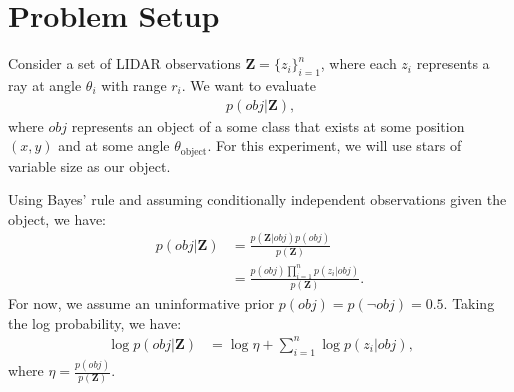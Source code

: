\section{Problem Setup}

Consider a set of LIDAR observations $\mathbf{Z} = \{ z_i \}_{i=1}^n$, where
each $z_i$ represents a ray at angle $\theta_i$ with range $r_i$. We
want to evaluate
%
\begin{align}
  p( obj | \mathbf{Z} )
  \text{,}
\end{align}
%
where $obj$ represents an object of a some class that exists at some position $(x,
y)$ and at some angle $\theta_{\text{object}}$. For this experiment, we will use
stars of variable size as our object.

Using Bayes' rule and assuming conditionally independent observations given the
object, we have:
%
\begin{align}
  p( obj | \mathbf{Z} ) &= \frac{p(\mathbf{Z} | obj) p(obj)}{p(\mathbf{Z})} \\
    &= \frac{p(obj) \prod_{i=1}^{n} { p( z_i | obj) }} {p(\mathbf{Z})}
  \text{.}
\end{align}
%
For now, we assume an uninformative prior $p(obj) = p(\lnot obj) = 0.5$. Taking
the log probability, we have:
%
\begin{align}
  \log p( obj | \mathbf{Z} ) &= \log{\eta} + \sum_{i=1}^{n} { \log p( z_i | obj) }
  \text{,}
  \label{eq:obj_model}
\end{align}
%
where $\eta = \frac{p(obj)}{p(\mathbf{Z})}$.
